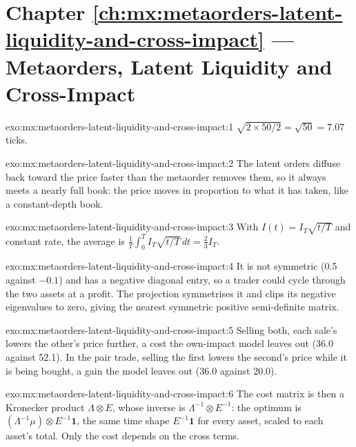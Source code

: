 \section*{Chapter \ref{ch:mx:metaorders-latent-liquidity-and-cross-impact} --- Metaorders, Latent Liquidity and Cross-Impact}

\begin{solution}{exo:mx:metaorders-latent-liquidity-and-cross-impact:1}
$\sqrt{2\times50/2}=\sqrt{50}=7.07$ ticks.
\end{solution}

\begin{solution}{exo:mx:metaorders-latent-liquidity-and-cross-impact:2}
The latent orders diffuse back toward the price faster than the metaorder removes them, so it always meets a nearly full book: the price moves in
proportion to what it has taken, like a constant-depth book.
\end{solution}

\begin{solution}{exo:mx:metaorders-latent-liquidity-and-cross-impact:3}
With $I(t)=I_T\sqrt{t/T}$ and constant rate, the average is $\frac1T\int_0^TI_T\sqrt{t/T}\,dt=\tfrac23I_T$.
\end{solution}

\begin{solution}{exo:mx:metaorders-latent-liquidity-and-cross-impact:4}
It is not symmetric (0.5 against $-0.1$) and has a negative diagonal entry, so a trader could cycle through the two assets at a profit. The projection
symmetrises it and clips its negative eigenvalues to zero, giving the nearest symmetric positive semi-definite matrix.
\end{solution}

\begin{solution}{exo:mx:metaorders-latent-liquidity-and-cross-impact:5}
Selling both, each sale's  lowers the other's price further, a cost the own-impact model leaves out (36.0 against 52.1). In the pair trade,
selling the first lowers the second's price while it is being bought, a gain the model leaves out (36.0 against 20.0).
\end{solution}

\begin{solution}{exo:mx:metaorders-latent-liquidity-and-cross-impact:6}
The cost matrix is then a Kronecker product $\Lambda\otimes E$, whose inverse is $\Lambda^{-1}\otimes E^{-1}$: the optimum is $(\Lambda^{-1}\mu)\otimes
E^{-1}\mathbf 1$, the same time shape $E^{-1}\mathbf 1$ for every asset, scaled to each asset's total. Only the cost depends on the cross terms.
\end{solution}


